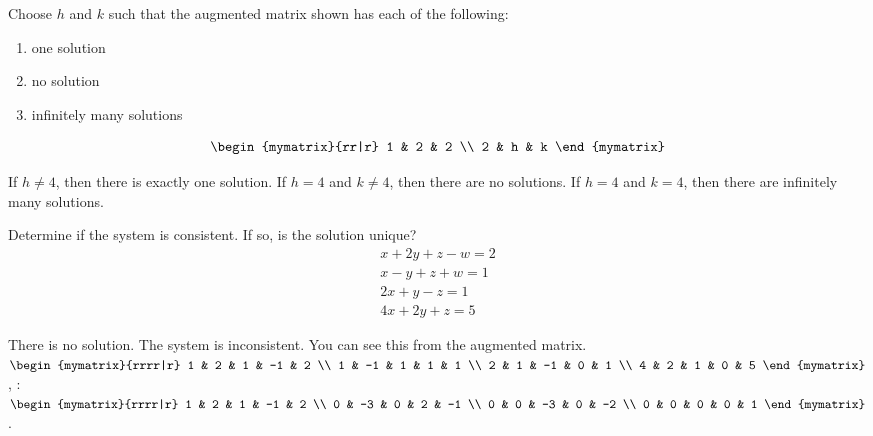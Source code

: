 \begin{ex}
  Choose $h$ and $k$ such that the augmented matrix shown has each of the following:
  \begin{enumerate}
  \item one solution
  \item no solution
  \item infinitely many solutions
  \end{enumerate}
  \begin{equation*}
    \begin{mymatrix}{rr|r}
      1 & 2 & 2 \\
      2 & h & k
    \end{mymatrix}
  \end{equation*}
  \begin{sol}
    If $h\neq 4$, then there is exactly one solution. If $h=4$ and $k\neq 4$,
    then there are no solutions. If $h=4$ and $k=4$, then there are infinitely
    many solutions.
  \end{sol}
\end{ex}

\begin{ex}
  Determine if the system is consistent. If so, is the solution unique?
  \begin{equation*}
    \begin{array}{c}
      x+2y+z-w=2 \\
      x-y+z+w=1 \\
      2x+y-z=1 \\
      4x+2y+z=5
    \end{array}
  \end{equation*}
  \begin{sol}
    There is no solution. The system is inconsistent. You can see this from the
    augmented matrix. $\begin{mymatrix}{rrrr|r}
      1 & 2 & 1 & -1 & 2 \\
      1 & -1 & 1 & 1 & 1 \\
      2 & 1 & -1 & 0 & 1 \\
      4 & 2 & 1 & 0 & 5
    \end{mymatrix}$, {\ef}: $\begin{mymatrix}{rrrr|r}
      1 & 2 & 1 & -1 & 2 \\
      0 & -3 & 0 & 2 & -1 \\
      0 & 0 & -3 & 0 & -2 \\
      0 & 0 & 0 & 0 & 1
    \end{mymatrix}$.
  \end{sol}
\end{ex}


